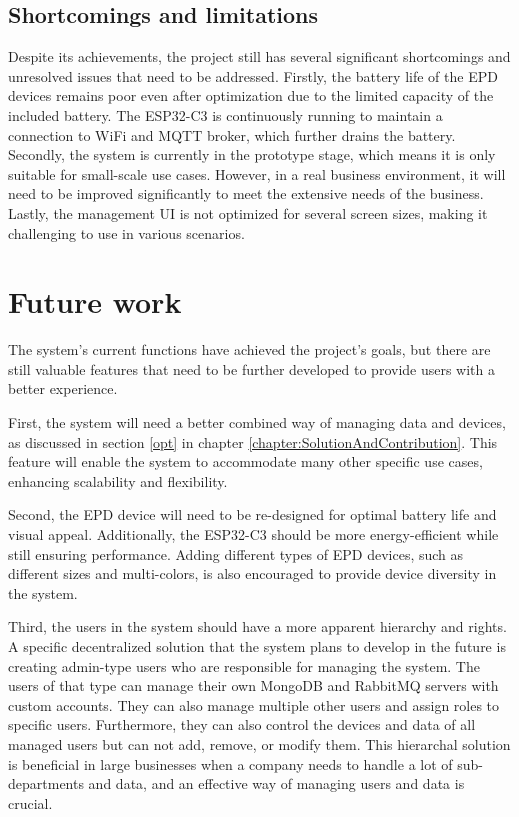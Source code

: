 \documentclass[../Main.tex]{subfiles}
\begin{document}
\subsection{Shortcomings and limitations}
Despite its achievements, the project still has several significant shortcomings and unresolved issues that need to be addressed. Firstly, the battery life of the EPD devices remains poor even after optimization due to the limited capacity of the included battery. The ESP32-C3 is continuously running to maintain a connection to WiFi and MQTT broker, which further drains the battery. Secondly, the system is currently in the prototype stage, which means it is only suitable for small-scale use cases. However, in a real business environment, it will need to be improved significantly to meet the extensive needs of the business. Lastly, the management UI is not optimized for several screen sizes, making it challenging to use in various scenarios.

\section{Future work}

The system's current functions have achieved the project's goals, but there are still valuable features that need to be further developed to provide users with a better experience.

First, the system will need a better combined way of managing data and devices, as discussed in section \ref{opt} in chapter \ref{chapter:SolutionAndContribution}. This feature will enable the system to accommodate many other specific use cases, enhancing scalability and flexibility. 

Second, the EPD device will need to be re-designed for optimal battery life and visual appeal. Additionally, the ESP32-C3 should be more energy-efficient while still ensuring performance. Adding different types of EPD devices, such as different sizes and multi-colors, is also encouraged to provide device diversity in the system.

Third, the users in the system should have a more apparent hierarchy and rights. A specific decentralized solution that the system plans to develop in the future is creating admin-type users who are responsible for managing the system. The users of that type can manage their own MongoDB and RabbitMQ servers with custom accounts. They can also manage multiple other users and assign roles to specific users. Furthermore, they can also control the devices and data of all managed users but can not add, remove, or modify them. This hierarchal solution is beneficial in large businesses when a company needs to handle a lot of sub-departments and data, and an effective way of managing users and data is crucial.
\end{document}
